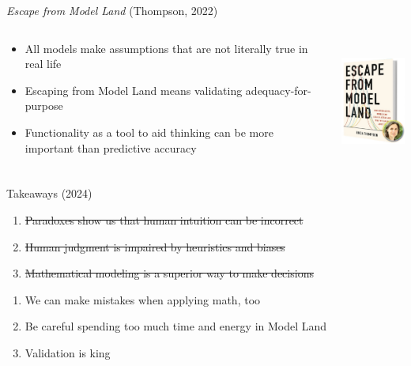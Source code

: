 \documentclass[handout]{beamer}
\begin{document}
  \begin{frame}{{\it Escape from Model Land} (Thompson, 2022)}
    \begin{columns}
      \begin{column}{0.6\textwidth}
        \begin{itemize}
          \item All models make assumptions that are not literally true in real life
          \item Escaping from Model Land means validating adequacy-for-purpose
          \item Functionality as a tool to aid thinking can be more important than predictive accuracy
        \end{itemize}
      \end{column}
      \begin{column}{0.3\textwidth}
        \includegraphics[height = 4cm]{images/escape_from_model_land.jpg}
      \end{column}
    \end{columns}
  \end{frame}

  \begin{frame}{Takeaways (2024)}
    \begin{enumerate}
      \item \sout{Paradoxes show us that human intuition can be incorrect}
      \item \sout{Human judgment is impaired by heuristics and biases}
      \item \sout{Mathematical modeling is a superior way to make decisions}
    \end{enumerate}
    \pause
    \begin{enumerate}
      \item We can make mistakes when applying math, too
      \item Be careful spending too much time and energy in Model Land
      \item Validation is king
    \end{enumerate}
  \end{frame}
\end{document}
